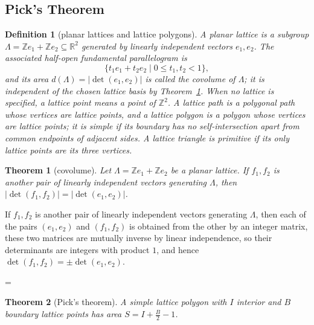 \documentclass[11pt]{article}
\makeatletter
\theoremstyle{ntstyle}
\newtheorem{theorem}{Theorem}[subsection]
\newtheorem{definition}{Definition}[subsection]
\let\nt@closedisplay\]
\def\nt@guardedclose{\@ifnextchar\par{\nt@closeafterpar}{\@ifnextchar\end{\postdisplaypenalty\@M\nt@closedisplay}{\nt@closedisplay}}}
\def\nt@closeafterpar\par{\@ifnextchar\par{\nt@closeafterpar}{\@ifnextchar\end{\postdisplaypenalty\@M\nt@closedisplay\par}{\nt@closedisplay\par}}}
\renewenvironment{proof}[1][\proofname]{\par
  \pushQED{\qed}\normalfont\topsep\medskipamount\edef\nt@afterproof{\@endparpenalty=\the\@endparpenalty\relax}\@beginparpenalty\@M\@endparpenalty\@M\let\]\nt@guardedclose\trivlist\item[]\textit{#1\@addpunct{.}} \ignorespaces}{\ifvmode\addpenalty\@M\fi\popQED\nt@afterproof\endtrivlist\@endpefalse}
\makeatother
\begin{document}
\subsection{Pick's Theorem}

\begin{definition}[planar lattices and lattice polygons]\label{def:10.8.1}
	A planar lattice is a subgroup
	$\Lambda=\mathbb{Z}e_1+\mathbb{Z}e_2\subseteq\mathbb{R}^2$ generated by
	linearly independent vectors $e_1,e_2$. The associated half-open
	fundamental parallelogram is
	\[
		\{t_1e_1+t_2e_2\mid 0\le t_1,t_2<1\},
	\]
	and its area $d(\Lambda)=|\det(e_1,e_2)|$ is called the covolume of
	$\Lambda$; it is independent of the chosen lattice basis by
	Theorem~\ref{thm:10.8.1}. When no lattice
	is specified, a lattice point means a point of $\mathbb{Z}^2$. A lattice
	path is a polygonal path whose vertices are lattice points, and a lattice
	polygon is a polygon whose vertices are lattice points; it is simple if
	its boundary has no self-intersection apart from common endpoints of
	adjacent sides. A lattice triangle is primitive if its only lattice
	points are its three vertices.

\end{definition}
\begin{theorem}[covolume]\label{thm:10.8.1}
	Let $\Lambda=\mathbb{Z}e_1+\mathbb{Z}e_2$ be a planar lattice. If $f_1,f_2$ is
	another pair of linearly independent vectors generating $\Lambda$, then
	$|\det(f_1,f_2)|=|\det(e_1,e_2)|$.

\end{theorem}

\begin{proof} If $f_1,f_2$ is
	another pair of linearly independent vectors generating $\Lambda$, then
	each of the pairs $(e_1,e_2)$ and $(f_1,f_2)$ is obtained from the other
	by an integer matrix, these two matrices are mutually inverse by linear
	independence, so their determinants are integers with product $1$, and
	hence $\det(f_1,f_2)=\pm\det(e_1,e_2)$.

\end{proof}
\begin{theorem}[Pick's theorem]\label{thm:10.8.2} A simple lattice polygon
	with $I$ interior and $B$ boundary lattice points has area $S = I +
		\tfrac{B}{2} - 1$.

\end{theorem}
\end{document}
